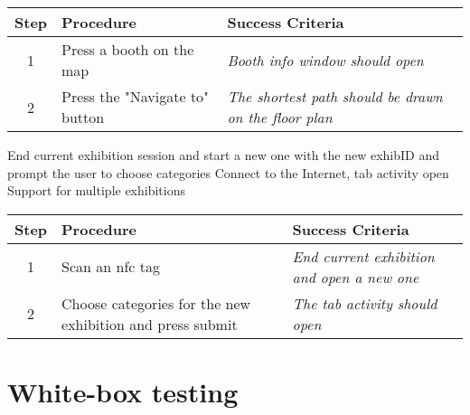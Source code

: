 \begin{center}
\begin{tabular}{| c | p{4.6cm} | p{4.6cm} |}
\hline
\textbf{Step} & \textbf{Procedure} & \textbf{Success Criteria}\\
\hline
1 & Press a booth on the map & \textit{Booth info window should open}\\
\hline
2 & Press the "Navigate to" button & \textit{The shortest path should be drawn on the floor plan}\\
\hline
\end{tabular}
\end{center}

\testcase
{\casenine}
{End current exhibition session and start a new one with the new exhibID and prompt the user to choose categories}
{Connect to the Internet, tab activity open}
{Support for multiple exhibitions}
\begin{center}
\begin{tabular}{| c | p{4.6cm} | p{4.6cm} |}
\hline
\textbf{Step} & \textbf{Procedure} & \textbf{Success Criteria}\\
\hline
1 & Scan an \ac{nfc} tag & \textit{End current exhibition and open a new one}\\
\hline
2 & Choose categories for the new exhibition and press submit & \textit{The tab activity should open}\\
\hline
\end{tabular}
\end{center}

\section{White-box testing}


